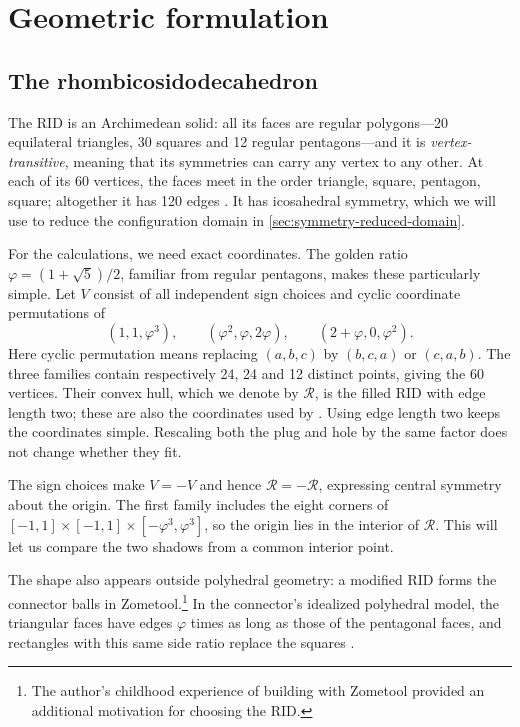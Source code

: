 \pagebreak[0]
\section{Geometric formulation}\label{sec:geometric-formulation}
\subsection{The rhombicosidodecahedron}\label{subsec:the-rhombicosidodecahedron}

The RID is an Archimedean solid: all its faces are regular polygons---20
equilateral triangles, 30 squares and 12 regular pentagons---and it is
\emph{vertex-transitive}, meaning that its symmetries can carry any vertex
to any other. At each of its 60 vertices, the faces meet in the order
triangle, square, pentagon, square; altogether it has 120 edges
\citep{McCooeyRID}. It has icosahedral symmetry, which we will use to reduce
the configuration domain in \cref{sec:symmetry-reduced-domain}.

For the calculations, we need exact coordinates. The golden ratio
$\varphi=(1+\sqrt5)/2$, familiar from regular pentagons, makes these
particularly simple. Let $V$ consist of all
independent sign choices and cyclic coordinate permutations of
\begin{equation}\label{eq:rhombicosidodecahedron-vertices}
  (1,1,\varphi^3),\qquad
  (\varphi^2,\varphi,2\varphi),\qquad
  (2+\varphi,0,\varphi^2).
\end{equation}
Here cyclic permutation means replacing $(a,b,c)$ by $(b,c,a)$ or $(c,a,b)$.
The three families contain respectively 24, 24 and 12 distinct points,
giving the 60 vertices. Their convex hull, which we denote by $\mathcal R$, is the
filled RID with edge length two; these are also the coordinates used by
\citet{SteiningerYurkevich2023}.
Using edge length two keeps the coordinates simple. Rescaling both the plug
and hole by the same factor does not change whether they fit.

The sign choices make $V=-V$ and hence $\mathcal R=-\mathcal R$, expressing central symmetry
about the origin. The first family includes the eight corners of
$[-1,1]\times[-1,1]\times[-\varphi^3,\varphi^3]$, so the origin lies in
the interior of $\mathcal R$. This will let us compare the two shadows from a common
interior point.

The shape also appears outside polyhedral geometry: a modified RID forms
the connector balls in Zometool.\footnote{The author's childhood experience
of building with Zometool provided an additional motivation for choosing
the RID.} In the connector's idealized polyhedral model, the triangular
faces have edges $\varphi$ times as long as those of the pentagonal faces,
and rectangles with this same side ratio replace the squares
\citep[pp.~51, 197]{HartPicciotto2001}.

